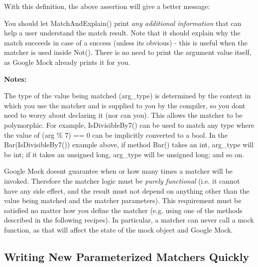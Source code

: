 With this definition, the above assertion will give a better message\+: 
\begin{DoxyCode}{0}
\end{DoxyCode}


You should let {\ttfamily Match\+And\+Explain()} print {\itshape any additional information} that can help a user understand the match result. Note that it should explain why the match succeeds in case of a success (unless it\textquotesingle{}s obvious) -\/ this is useful when the matcher is used inside {\ttfamily Not()}. There is no need to print the argument value itself, as Google Mock already prints it for you.

{\bfseries Notes\+:}


\begin{DoxyEnumerate}
\item The type of the value being matched ({\ttfamily arg\+\_\+type}) is determined by the context in which you use the matcher and is supplied to you by the compiler, so you don\textquotesingle{}t need to worry about declaring it (nor can you). This allows the matcher to be polymorphic. For example, {\ttfamily Is\+Divisible\+By7()} can be used to match any type where the value of {\ttfamily (arg \% 7) == 0} can be implicitly converted to a {\ttfamily bool}. In the {\ttfamily Bar(\+Is\+Divisible\+By7())} example above, if method {\ttfamily Bar()} takes an {\ttfamily int}, {\ttfamily arg\+\_\+type} will be {\ttfamily int}; if it takes an {\ttfamily unsigned long}, {\ttfamily arg\+\_\+type} will be {\ttfamily unsigned long}; and so on.
\end{DoxyEnumerate}
\begin{DoxyEnumerate}
\item Google Mock doesn\textquotesingle{}t guarantee when or how many times a matcher will be invoked. Therefore the matcher logic must be {\itshape purely functional} (i.\+e. it cannot have any side effect, and the result must not depend on anything other than the value being matched and the matcher parameters). This requirement must be satisfied no matter how you define the matcher (e.\+g. using one of the methods described in the following recipes). In particular, a matcher can never call a mock function, as that will affect the state of the mock object and Google Mock.
\end{DoxyEnumerate}

\subsection*{Writing New Parameterized Matchers Quickly}

